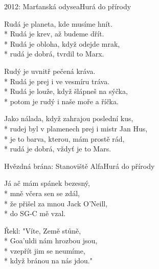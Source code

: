 \documentclass[10.5pt]{book}
\begin{document}
\begin{poem}{2012: Marťanská odysea}{Hurá do přírody}

\settowidth{\versewidth}{rudej byl v plamenech prej i mistr Jan Hus,}

Rudá je planeta, kde musíme hnít.\\*
Rudá je krev, až budeme dřít.\\*
Rudá je obloha, když odejde mrak,\\*
rudá je dobrá, tvrdil to Marx.

Rudý je uvnitř pečená kráva.\\*
Rudá je prej i ve vesmíru tráva.\\*
Rudá je louže, když šlápneš na sýčka,\\*
potom je rudý i naše moře a říčka.

Jako nálada, když zahrajou poslední kus,\\*
rudej byl v plamenech prej i mistr Jan Hus,\\*
je to barva, kterou, mám prostě rád,\\*
rudá je dobrá, vždyť je to Mars.



\end{poem}

\begin{poem}{Hvězdná brána: Stanoviště Alfa}{Hurá do přírody}

\settowidth{\versewidth}{že přišel za mnou Jack O'Neill,}

Já ač mám spánek bezesný,\\*
mně včera sen se zdál,\\*
že přišel za mnou Jack O'Neill,\\*
do SG-C mě vzal. 

Řekl: "Víte, Země stůně,\\*
Goa'uldi nám hrozbou jsou,\\*
vzepřít jim se neumíme,\\*
když bránou na nás jdou."

\end{poem}
\end{document}

